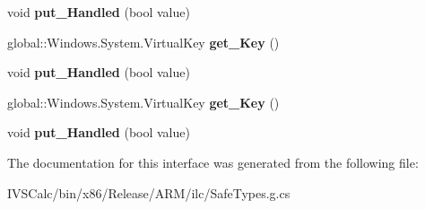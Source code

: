 \begin{DoxyCompactItemize}
\mbox{\label{interface_windows_1_1_u_i_1_1_xaml_1_1_input_1_1_i_key_routed_event_args_af336087f59825d61c5832fc56822c1da}} 
void {\bfseries put\+\_\+\+Handled} (bool value)
\item 
\mbox{\label{interface_windows_1_1_u_i_1_1_xaml_1_1_input_1_1_i_key_routed_event_args_af71b8e3e01507ea31eecd6cf063776ef}} 
global\+::\+Windows.\+System.\+Virtual\+Key {\bfseries get\+\_\+\+Key} ()
\item 
\mbox{\label{interface_windows_1_1_u_i_1_1_xaml_1_1_input_1_1_i_key_routed_event_args_af336087f59825d61c5832fc56822c1da}} 
void {\bfseries put\+\_\+\+Handled} (bool value)
\item 
\mbox{\label{interface_windows_1_1_u_i_1_1_xaml_1_1_input_1_1_i_key_routed_event_args_af71b8e3e01507ea31eecd6cf063776ef}} 
global\+::\+Windows.\+System.\+Virtual\+Key {\bfseries get\+\_\+\+Key} ()
\item 
\mbox{\label{interface_windows_1_1_u_i_1_1_xaml_1_1_input_1_1_i_key_routed_event_args_af336087f59825d61c5832fc56822c1da}} 
void {\bfseries put\+\_\+\+Handled} (bool value)
\end{DoxyCompactItemize}


The documentation for this interface was generated from the following file\+:\begin{DoxyCompactItemize}
\item 
I\+V\+S\+Calc/bin/x86/\+Release/\+A\+R\+M/ilc/Safe\+Types.\+g.\+cs\end{DoxyCompactItemize}
